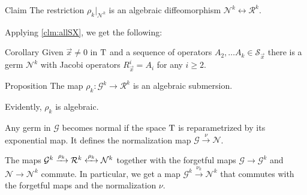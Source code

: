 \documentclass[a4paper,10pt]{article}
\begin{document}
\begin{thm}{Claim}\label{clm:diff}
The restriction $\rho_k|_{\mathcal{N}^k}$ is an algebraic diffeomorphism $\mathcal{N}^k\leftrightarrow\mathcal{R}^k$.
\end{thm}

Applying \ref{clm:allSX}, we get the following:

\begin{thm}{Corollary}\label{cor:Rall}
Given $\vec x\ne 0$ in $\mathrm{T}$ and a sequence of operators $A_2,\dots A_k\in \mathcal{S}_\vec x$ there is a germ $\mathcal{N}^k$ with Jacobi operators $R^i_\vec x=A_i$ for any $i\ge 2$.
\end{thm}

\begin{thm}{Proposition}\label{prop:submersion}
The map $\rho_k:\mathcal{G}^k\to \mathcal{R}^k$ is an algebraic submersion.
\end{thm}

\begin{wrapfigure}{r}{35mm}
\vskip-4mm
\centering
{}
\label{diagram-page}
\end{wrapfigure}

Evidently, $\rho_k$ is algebraic.

Any germ in $\mathcal{G}$ becomes normal if the space $\mathrm{T}$ is reparametrized by its exponential map.
It defines the normalization map 
$\mathcal{G}\xrightarrow{\nu} \mathcal{N}$.

The maps $\mathcal{G}^k\xrightarrow{\rho_k}\mathcal{R}^k\z{\xleftrightarrow{\rho_k}}\mathcal{N}^k$ together with the forgetful maps $\mathcal{G}\to\mathcal{G}^k$ and $\mathcal{N}\to\mathcal{N}^k$  commute.
In particular, we get a map $\mathcal{G}^k\xrightarrow{\nu_k}\mathcal{N}^k$ that commutes with the forgetful maps and the normalization $\nu$.
\end{document}
